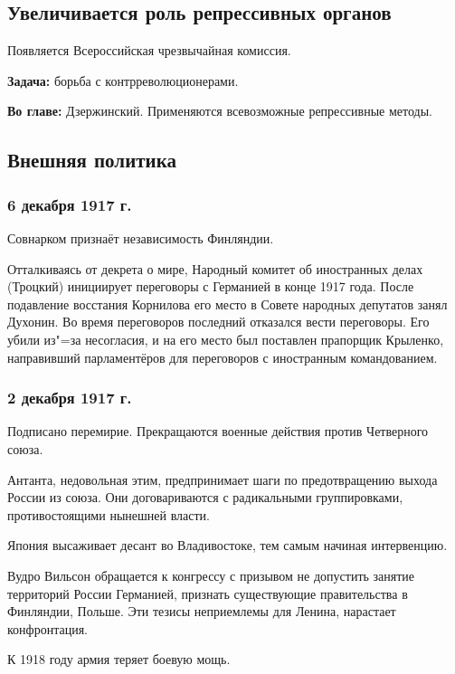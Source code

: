 \subsection{Увеличивается роль репрессивных органов}

Появляется Всероссийская чрезвычайная комиссия.

\textbf{Задача:} борьба с контрреволюционерами.

\textbf{Во главе:} Дзержинский.
Применяются всевозможные репрессивные методы.

\subsection{Внешняя политика}

\subsubsection{\textbf{6 декабря 1917 г.}}

Совнарком признаёт независимость Финляндии.

Отталкиваясь от декрета о мире, Народный комитет об иностранных делах (Троцкий) инициирует переговоры с Германией в конце 1917 года. После подавление восстания Корнилова его место в Совете народных депутатов занял Духонин. Во время переговоров последний отказался вести переговоры. Его убили из"=за несогласия, и на его место был поставлен прапорщик Крыленко, направивший парламентёров для переговоров с иностранным командованием.

\subsubsection{\textbf{2 декабря 1917 г.}}

Подписано перемирие. Прекращаются военные действия против Четверного союза.

Антанта, недовольная этим, предпринимает шаги по предотвращению выхода России из союза. Они договариваются с радикальными группировками, противостоящими нынешней власти.

Япония высаживает десант во Владивостоке, тем самым начиная интервенцию.

Вудро Вильсон обращается к конгрессу с призывом не допустить занятие территорий России Германией, признать существующие правительства в Финляндии, Польше. Эти тезисы неприемлемы для Ленина, нарастает конфронтация.

К 1918 году армия теряет боевую мощь.

